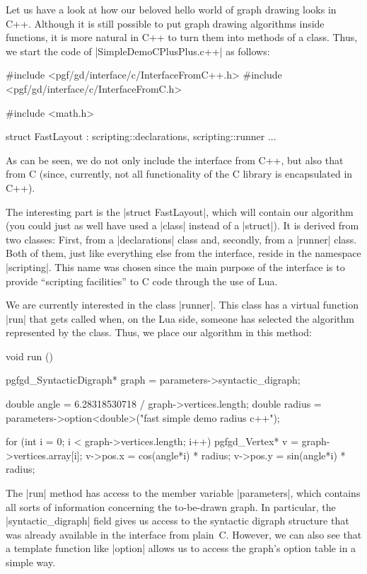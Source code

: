 Let us have a look at how our beloved hello world of graph drawing
looks in C++. Although it is still possible to put graph drawing
algorithms inside functions, it is more natural in C++ to turn them
into methods of a class. Thus, we start the code of
|SimpleDemoCPlusPlus.c++| as follows:

\begin{codeexample}
#include <pgf/gd/interface/c/InterfaceFromC++.h>
#include <pgf/gd/interface/c/InterfaceFromC.h>

#include <math.h>

struct FastLayout : scripting::declarations, scripting::runner {
  ...
}
\end{codeexample}

As can be seen, we do not only include the interface from C++, but
also that from C (since, currently, not all functionality of the C
library is encapsulated in C++).

The interesting part is the |struct FastLayout|, which will contain our
algorithm (you could just as well have used a |class| instead of a
|struct|). It is derived from two classes: First, from a
|declarations| class and, secondly, from a |runner| class. Both of
them, just like everything else from the interface, reside in the
namespace |scripting|. This name was chosen since the main purpose of
the interface is to provide ``scripting facilities'' to C code through
the use of Lua.

We are currently interested in the class |runner|. This class has a
virtual function |run| that gets called when, on the Lua side, someone
has selected the algorithm represented by the class. Thus, we place
our algorithm in this method:

\begin{codeexample}
void run () {
  pgfgd_SyntacticDigraph* graph = parameters->syntactic_digraph;
    
  double angle  = 6.28318530718 / graph->vertices.length;
  double radius = parameters->option<double>("fast simple demo radius c++");
  
  for (int i = 0; i < graph->vertices.length; i++) {
    pgfgd_Vertex* v = graph->vertices.array[i];
    v->pos.x = cos(angle*i) * radius;
    v->pos.y = sin(angle*i) * radius;
  }
}
\end{codeexample}

The |run| method has access to the member variable |parameters|, which
contains all sorts of information concerning the to-be-drawn graph. In
particular, the |syntactic_digraph| field gives us access to the
syntactic digraph structure that was already available in the
interface from plain~C. However, we can also see that a template
function like |option| allows us to access the graph's option table in
a simple way.

